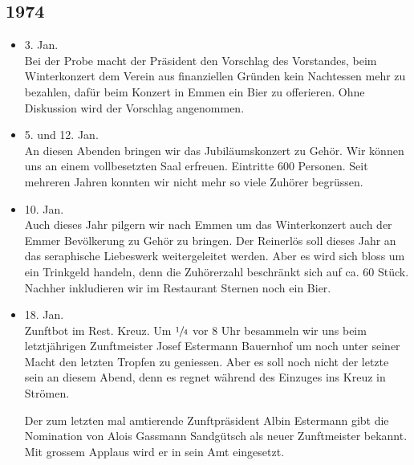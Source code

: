 \subsection{1974}

\begin{history}


    \begin{itemize}
        \item 3. Jan.\\
              Bei der Probe macht der Präsident den Vorschlag des Vorstandes, beim
              Winterkonzert dem Verein aus finanziellen Gründen kein Nachtessen mehr
              zu bezahlen, dafür beim Konzert in Emmen ein Bier zu offerieren. Ohne
              Diskussion wird der Vorschlag angenommen.

        \item 5. und 12. Jan.\\
              An diesen Abenden bringen wir das Jubiläumskonzert zu Gehör. Wir können
              uns an einem vollbesetzten Saal erfreuen. Eintritte 600 Personen. Seit
              mehreren Jahren konnten wir nicht mehr so viele Zuhörer begrüssen.

        \item 10. Jan.\\
              Auch dieses Jahr pilgern wir nach Emmen um das Winterkonzert auch der
              Emmer Bevölkerung zu Gehör zu bringen. Der Reinerlös soll dieses Jahr an
              das seraphische Liebeswerk weitergeleitet werden. Aber es wird sich
              bloss um ein Trinkgeld handeln, denn die Zuhörerzahl beschränkt sich auf
              ca. 60 Stück. Nachher inkludieren wir im Restaurant Sternen noch ein
              Bier.

        \item 18. Jan.\\
              Zunftbot im Rest. Kreuz. Um $\sfrac{1}{4}$ vor 8 Uhr besammeln wir uns
              beim letztjährigen Zunftmeister Josef Estermann Bauernhof um noch unter
              seiner Macht den letzten Tropfen zu geniessen. Aber es soll noch nicht
              der letzte sein an diesem Abend, denn es regnet während des Einzuges ins
              Kreuz in Strömen.

              Der zum letzten mal amtierende Zunftpräsident Albin Estermann gibt die
              Nomination von Alois Gassmann Sandgütsch als neuer Zunftmeister bekannt.
              Mit grossem Applaus wird er in sein Amt eingesetzt.


\end{itemize}
\end{history}
